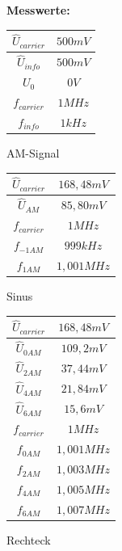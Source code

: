 \begin{figure}[H]
\textbf{Messwerte:} \centering \\
 \begin{minipage}[c]{.3\textwidth}
 \centering
  \begin{tabular}{c|c}
   $\hat{U}_{carrier}$ & $500mV$ \\ \hline
   $\hat{U}_{info}$ & $500mV$ \\ \hline
   $U_0$ & $0V$ \\ \hline
   $f_{carrier}$ & $1MHz$ \\ \hline
   $f_{info}$ & $1kHz$ \\ \hline
  \end{tabular}
  \caption{AM-Signal}
 \end{minipage}
 \begin{minipage}[c]{.3\textwidth}
 \centering
  \begin{tabular}{c|c}
   $\hat{U}_{carrier}$ & $168,48mV$ \\ \hline
   $\hat{U}_{AM}$ & $85,80mV$ \\ \hline
   $f_{carrier}$ & $1MHz$ \\ \hline
   $f_{-1AM}$ & $999kHz$ \\ \hline
   $f_{1AM}$ & $1,001MHz$ \\ \hline
  \end{tabular}
  \caption{Sinus}
 \end{minipage}
 \begin{minipage}[c]{.3\textwidth}
 \centering
  \begin{tabular}{c|c}
   $\hat{U}_{carrier}$ & $168,48mV$ \\ \hline
   $\hat{U}_{0AM}$ & $109,2mV$ \\ \hline
   $\hat{U}_{2AM}$ & $37,44mV$ \\ \hline
   $\hat{U}_{4AM}$ & $21,84mV$ \\ \hline
   $\hat{U}_{6AM}$ & $15,6mV$ \\ \hline
   $f_{carrier}$ & $1MHz$ \\ \hline
   $f_{0AM}$ & $1,001MHz$ \\ \hline
   $f_{2AM}$ & $1,003MHz$ \\ \hline
   $f_{4AM}$ & $1,005MHz$ \\ \hline
   $f_{6AM}$ & $1,007MHz$ \\ \hline
  \end{tabular}
  \caption{Rechteck}
 \end{minipage}
\end{figure}

